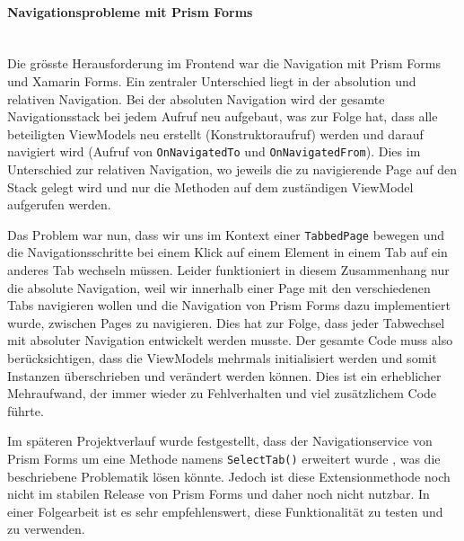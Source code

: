 \paragraph*{Navigationsprobleme mit Prism Forms}\label{subsub:navigation}~\\


Die grösste Herausforderung im Frontend war die Navigation mit Prism Forms und Xamarin Forms. Ein zentraler Unterschied liegt in der absolution und relativen Navigation. Bei der absoluten Navigation wird der gesamte Navigationsstack bei jedem Aufruf neu aufgebaut, was zur Folge hat, dass alle beteiligten ViewModels neu erstellt (Konstruktoraufruf) werden und darauf navigiert wird (Aufruf von \texttt{OnNavigatedTo} und \texttt{OnNavigatedFrom}). Dies im Unterschied zur relativen Navigation, wo jeweils die zu navigierende Page auf den Stack gelegt wird und nur die Methoden auf dem zuständigen ViewModel aufgerufen werden. 

Das Problem war nun, dass wir uns im Kontext einer \texttt{TabbedPage} bewegen und die Navigationsschritte bei einem Klick auf einem Element in einem Tab auf ein anderes Tab wechseln müssen. Leider funktioniert in diesem Zusammenhang nur die absolute Navigation, weil wir innerhalb einer Page mit den verschiedenen Tabs navigieren wollen und die Navigation von Prism Forms dazu implementiert wurde, zwischen Pages zu navigieren. Dies hat zur Folge, dass jeder Tabwechsel mit absoluter Navigation entwickelt werden musste. Der gesamte Code muss also berücksichtigen, dass die ViewModels mehrmals initialisiert werden und somit Instanzen überschrieben und verändert werden können. Dies ist ein erheblicher Mehraufwand, der immer wieder zu Fehlverhalten und viel zusätzlichem Code führte. 

Im späteren Projektverlauf wurde festgestellt, dass der Navigationservice von Prism Forms um eine Methode namens \texttt{SelectTab()} erweitert wurde \cite{prism-selecttab}, was die beschriebene Problematik lösen könnte. Jedoch ist diese Extensionmethode noch nicht im stabilen Release von Prism Forms und daher noch nicht nutzbar. In einer Folgearbeit ist es sehr empfehlenswert, diese Funktionalität zu testen und zu verwenden. 

